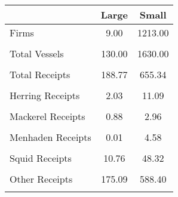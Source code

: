 \begin{tabular}{l*{2}{c}}
\hline\hline
                &    Large&    Small\\
\hline
Firms           &     9.00&  1213.00\\
                &         &         \\
Total Vessels   &   130.00&  1630.00\\
                &         &         \\
Total Receipts  &   188.77&   655.34\\
                &         &         \\
Herring Receipts&     2.03&    11.09\\
                &         &         \\
Mackerel Receipts&     0.88&     2.96\\
                &         &         \\
Menhaden Receipts&     0.01&     4.58\\
                &         &         \\
Squid Receipts  &    10.76&    48.32\\
                &         &         \\
Other Receipts  &   175.09&   588.40\\
                &         &         \\
\hline\hline
\end{tabular}
